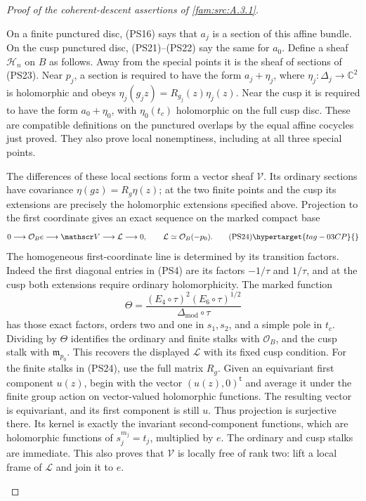 \begin{proof}[Proof of the coherent-descent assertions of \cref{fam:src:A.3.1}]
\begin{enumerate}[label=\arabic*.,leftmargin=*]
On a finite punctured disc, (PS16) says that $a_j$ is a section of
this affine bundle. On the cusp punctured disc, (PS21)--(PS22) say
the same for $a_0$. Define a sheaf $\mathscr H_n$ on $B$ as follows.
Away from the special points it is the sheaf of sections of (PS23).
Near $p_j$, a section is required to have the form $a_j+\eta_j$,
where $\eta_j:\Delta_j\to\mathbb C^2$ is holomorphic and obeys
$\eta_j(g_jz)=R_{g_j}(z)\eta_j(z)$. Near the cusp it is required
to have the form $a_0+\eta_0$, with $\eta_0(t_c)$ holomorphic on
the full cusp disc. These are compatible definitions on the punctured
overlaps by the equal affine cocycles just proved. They also prove
local nonemptiness, including at all three special points.

The differences of these local sections form a vector sheaf
$\mathscr V$. Its ordinary sections have covariance $\eta(gz)=R_g\eta(z)$;
at the two finite points and the cusp its extensions are precisely
the holomorphic extensions specified above. Projection to the first
coordinate gives an exact sequence on the marked compact base
\[
 0\longrightarrow\mathcal O_B e\longrightarrow\mathscr V
        \longrightarrow\mathcal L\longrightarrow0,
                  \qquad \mathcal L\simeq\mathcal O_B(-p_0).
 \tag{PS24}\hypertarget{tag-03CP}{}\label{wb:pshift:eq:vector-sheaf}
\]
The homogeneous first-coordinate line is determined by its transition factors. Indeed
the first diagonal entries in (PS4) are its factors $-1/\tau$ and
$1/\tau$, and at the cusp both extensions require ordinary
holomorphicity. The marked function
\[
 \Theta=\frac{(E_4\circ\tau)^2(E_6\circ\tau)^{1/2}}
                 {\Delta_{\mathrm{mod}}\circ\tau}
\]
has those exact factors, orders two and one in $s_1,s_2$, and a
simple pole in $t_c$. Dividing by $\Theta$ identifies the ordinary
and finite stalks with $\mathcal O_B$, and the cusp stalk with
$\mathfrak m_{p_0}$. This recovers the displayed $\mathcal L$
with its fixed cusp condition. 
For the finite stalks in (PS24), use the full matrix $R_g$. Given an equivariant first component
$u(z)$, begin with the vector $(u(z),0)^{\mathsf t}$ and average it
under the finite group action on vector-valued holomorphic functions.
The resulting vector is equivariant, and its first component is
still $u$. Thus projection is surjective there. Its kernel is
exactly the invariant second-component functions, which are
holomorphic functions of $s_j^{m_j}=t_j$, multiplied by $e$.
The ordinary and cusp stalks are immediate. This also proves that
$\mathscr V$ is locally free of rank two: lift a local frame of
$\mathcal L$ and join it to $e$.


\end{enumerate}
\end{proof}

